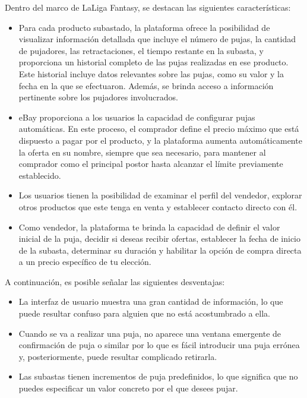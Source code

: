 Dentro del marco de LaLiga Fantasy, se destacan las siguientes características:
\begin{itemize}
    \item Para cada producto subastado, la plataforma ofrece la posibilidad de visualizar información detallada que incluye el número de pujas, la cantidad de pujadores, las retractaciones, el tiempo restante en la subasta, y proporciona un historial completo de las pujas realizadas en ese producto. Este historial incluye datos relevantes sobre las pujas, como su valor y la fecha en la que se efectuaron. Además, se brinda acceso a información pertinente sobre los pujadores involucrados.
    \item eBay proporciona a los usuarios la capacidad de configurar pujas automáticas. En este proceso, el comprador define el precio máximo que está dispuesto a pagar por el producto, y la plataforma aumenta automáticamente la oferta en su nombre, siempre que sea necesario, para mantener al comprador como el principal postor hasta alcanzar el límite previamente establecido.
    \item Los usuarios tienen la posibilidad de examinar el perfil del vendedor, explorar otros productos que este tenga en venta y establecer contacto directo con él.
    \item Como vendedor, la plataforma te brinda la capacidad de definir el valor inicial de la puja, decidir si deseas recibir ofertas, establecer la fecha de inicio de la subasta, determinar su duración y habilitar la opción de compra directa a un precio específico de tu elección.
\end{itemize}

A continuación, es posible señalar las siguientes desventajas:
\begin{itemize}
    \item La interfaz de usuario muestra una gran cantidad de información, lo que puede resultar confuso para alguien que no está acostumbrado a ella.
    \item Cuando se va a realizar una puja, no aparece una ventana emergente de confirmación de puja o similar por lo que es fácil introducir una puja errónea y, posteriormente, puede resultar complicado retirarla.
    \item Las subastas tienen incrementos de puja predefinidos, lo que significa que no puedes especificar un valor concreto por el que desees pujar.
\end{itemize}


